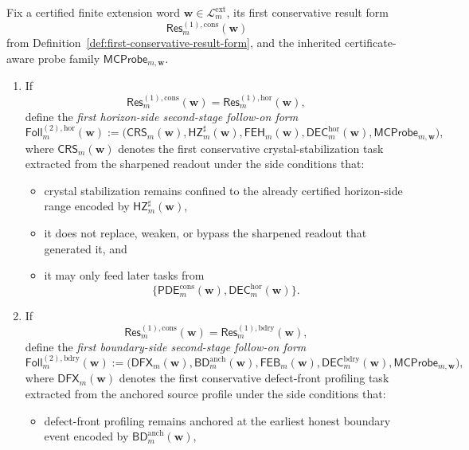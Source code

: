 \begin{definition}
\label{def:first-second-stage-follow-on-form}
Fix a certified finite extension word \(\mathbf w\in\mathcal L^{\mathrm{ext}}_{m}\), its first conservative result form
\[
  \mathsf{Res}^{(1),\mathrm{cons}}_{m}(\mathbf w)
\]
from Definition~\ref{def:first-conservative-result-form}, and the inherited certificate-aware probe family \(\mathsf{MCProbe}_{m,\mathbf w}\).
\begin{enumerate}[label=(\roman*)]
  \item If
  \[
    \mathsf{Res}^{(1),\mathrm{cons}}_{m}(\mathbf w)=\mathsf{Res}^{(1),\mathrm{hor}}_{m}(\mathbf w),
  \]
  define the \emph{first horizon-side second-stage follow-on form}
  \[
    \mathsf{Foll}^{(2),\mathrm{hor}}_{m}(\mathbf w)
    :=
    \bigl(\mathsf{CRS}_{m}(\mathbf w),\mathsf{HZ}^{\sharp}_{m}(\mathbf w),\mathsf{FEH}_{m}(\mathbf w),\mathsf{DEC}^{\mathrm{hor}}_{m}(\mathbf w),\mathsf{MCProbe}_{m,\mathbf w}\bigr),
  \]
  where \(\mathsf{CRS}_{m}(\mathbf w)\) denotes the first conservative crystal-stabilization task extracted from the sharpened readout under the side conditions that:
  \begin{itemize}[leftmargin=2em]
    \item crystal stabilization remains confined to the already certified horizon-side range encoded by \(\mathsf{HZ}^{\sharp}_{m}(\mathbf w)\),
    \item it does not replace, weaken, or bypass the sharpened readout that generated it, and
    \item it may only feed later tasks from
    \[
      \{\mathsf{PDE}^{\mathrm{cons}}_{m}(\mathbf w),\mathsf{DEC}^{\mathrm{hor}}_{m}(\mathbf w)\}.
    \]
  \end{itemize}
  \item If
  \[
    \mathsf{Res}^{(1),\mathrm{cons}}_{m}(\mathbf w)=\mathsf{Res}^{(1),\mathrm{bdry}}_{m}(\mathbf w),
  \]
  define the \emph{first boundary-side second-stage follow-on form}
  \[
    \mathsf{Foll}^{(2),\mathrm{bdry}}_{m}(\mathbf w)
    :=
    \bigl(\mathsf{DFX}_{m}(\mathbf w),\mathsf{BD}^{\mathrm{anch}}_{m}(\mathbf w),\mathsf{FEB}_{m}(\mathbf w),\mathsf{DEC}^{\mathrm{bdry}}_{m}(\mathbf w),\mathsf{MCProbe}_{m,\mathbf w}\bigr),
  \]
  where \(\mathsf{DFX}_{m}(\mathbf w)\) denotes the first conservative defect-front profiling task extracted from the anchored source profile under the side conditions that:
  \begin{itemize}[leftmargin=2em]
    \item defect-front profiling remains anchored at the earliest honest boundary event encoded by \(\mathsf{BD}^{\mathrm{anch}}_{m}(\mathbf w)\),

\end{itemize}
\end{enumerate}
\end{definition}
